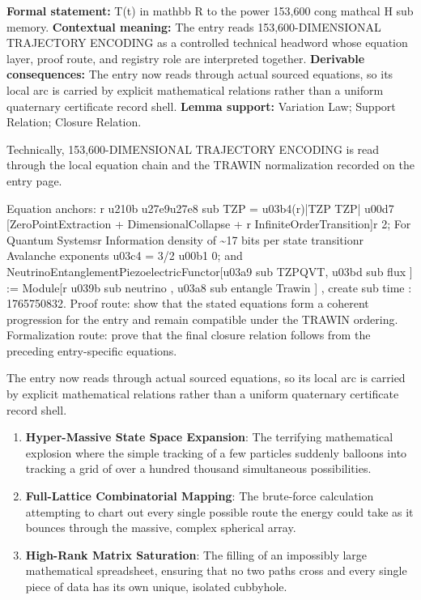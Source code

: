 \begingroup\footnotesize\setlength{\emergencystretch}{3em}\sloppy
\textbf{Formal statement:} T(t) in mathbb R to the power 153,600 cong mathcal H sub memory. \textbf{Contextual meaning:} The entry reads 153,600-DIMENSIONAL TRAJECTORY ENCODING as a controlled technical headword whose equation layer, proof route, and registry role are interpreted together. \textbf{Derivable consequences:} The entry now reads through actual sourced equations, so its local arc is carried by explicit mathematical relations rather than a uniform quaternary certificate record shell. \textbf{Lemma support:} Variation Law; Support Relation; Closure Relation.\par
\endgroup

Technically, 153,600-DIMENSIONAL TRAJECTORY ENCODING is read through the local equation chain and the TRAWIN normalization recorded on the entry page.

Equation anchors: r u210b u27e9u27e8 sub TZP = u03b4(r)|TZP TZP| u00d7 [ZeroPointExtraction + DimensionalCollapse + r InfiniteOrderTransition]r 2; For Quantum Systemsr Information density of \textasciitilde{}17 bits per state transitionr Avalanche exponents u03c4 = 3/2 u00b1 0; and NeutrinoEntanglementPiezoelectricFunctor[u03a9 sub TZPQVT, u03bd sub flux ] := Module[r u039b sub neutrino , u03a8 sub entangle Trawin ] , create sub time : 1765750832. Proof route: show that the stated equations form a coherent progression for the entry and remain compatible under the TRAWIN ordering. Formalization route: prove that the final closure relation follows from the preceding entry-specific equations.

The entry now reads through actual sourced equations, so its local arc is carried by explicit mathematical relations rather than a uniform quaternary certificate record shell.
\endgroup

\begin{enumerate}[leftmargin=1.6em,itemsep=6pt,topsep=4pt]
\item \textbf{Hyper-Massive State Space Expansion}: The terrifying mathematical explosion where the simple tracking of a few particles suddenly balloons into tracking a grid of over a hundred thousand simultaneous possibilities.
\item \textbf{Full-Lattice Combinatorial Mapping}: The brute-force calculation attempting to chart out every single possible route the energy could take as it bounces through the massive, complex spherical array.
\item \textbf{High-Rank Matrix Saturation}: The filling of an impossibly large mathematical spreadsheet, ensuring that no two paths cross and every single piece of data has its own unique, isolated cubbyhole.
\end{enumerate}

